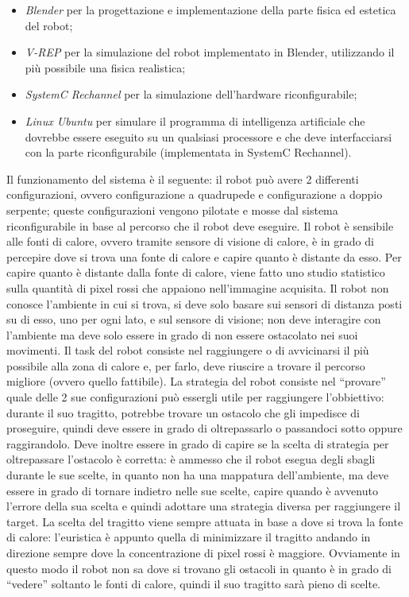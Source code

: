 \documentclass[a4paper,titlepage]{book}
\begin{document}
\begin{itemize}
  \item \textit{Blender} per la progettazione e implementazione della parte fisica ed estetica del robot;
  \item \textit{V-REP} per la simulazione del robot implementato in Blender, utilizzando il più possibile una fisica realistica;
  \item \textit{SystemC Rechannel} per la simulazione dell'hardware riconfigurabile;
  \item \textit{Linux Ubuntu} per simulare il programma di intelligenza artificiale che dovrebbe essere eseguito su un qualsiasi processore e che deve interfacciarsi con la parte riconfigurabile (implementata in SystemC Rechannel).
\end{itemize}

Il funzionamento del sistema è il seguente: il robot può avere 2 differenti configurazioni, ovvero configurazione a quadrupede e configurazione a doppio serpente; queste configurazioni vengono pilotate e mosse dal sistema riconfigurabile in base al percorso che il robot deve eseguire. Il robot è sensibile alle fonti di calore, ovvero tramite sensore di visione di calore, è in grado di percepire dove si trova una fonte di calore e capire quanto è distante da esso. Per capire quanto è distante dalla fonte di calore, viene fatto uno studio statistico sulla quantità di pixel rossi che appaiono nell'immagine acquisita.
Il robot non conosce l'ambiente in cui si trova, si deve solo basare sui sensori di distanza posti su di esso, uno per ogni lato, e sul sensore di visione; non deve interagire con l'ambiente ma deve solo essere in grado di non essere ostacolato nei suoi movimenti. Il task del robot consiste nel raggiungere o di avvicinarsi il più possibile alla zona di calore e, per farlo, deve riuscire a trovare il percorso migliore (ovvero quello fattibile).
La strategia del robot consiste nel ``provare'' quale delle 2 sue configurazioni può essergli utile per raggiungere l'obbiettivo: durante il suo tragitto, potrebbe trovare un ostacolo che gli impedisce di proseguire, quindi deve essere in grado di oltrepassarlo o passandoci sotto oppure raggirandolo. Deve inoltre essere in grado di capire se la scelta di strategia per oltrepassare l'ostacolo è corretta: è ammesso che il robot esegua degli sbagli durante le sue scelte, in quanto non ha una mappatura dell'ambiente, ma deve essere in grado di tornare indietro nelle sue scelte, capire quando è avvenuto l'errore della sua scelta e quindi adottare una strategia diversa per raggiungere il target.
La scelta del tragitto viene sempre attuata in base a dove si trova la fonte di calore: l'euristica è appunto quella di minimizzare il tragitto andando in direzione sempre dove la concentrazione di pixel rossi è maggiore. Ovviamente in questo modo il robot non sa dove si trovano gli ostacoli in quanto è in grado di ``vedere'' soltanto le fonti di calore, quindi il suo tragitto sarà pieno di scelte.
\end{document}
